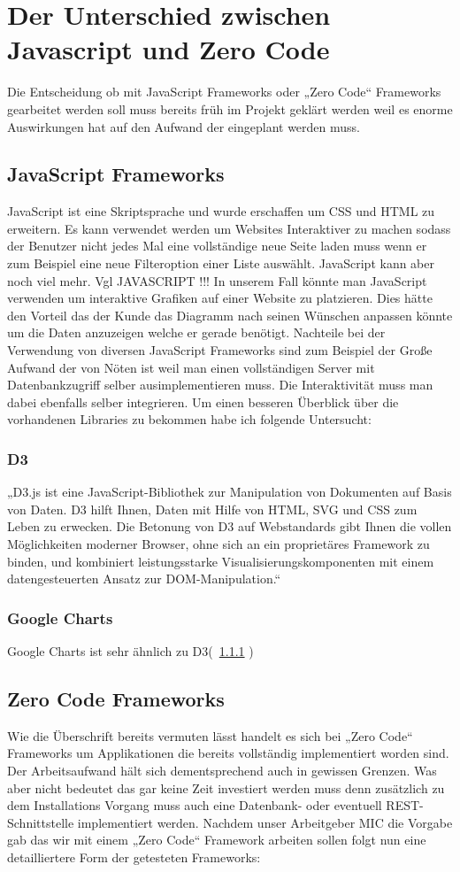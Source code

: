 \chapter{Der Unterschied zwischen Javascript und Zero Code}
Die Entscheidung ob mit JavaScript Frameworks oder „Zero Code“ Frameworks gearbeitet werden soll muss bereits früh im Projekt geklärt werden weil es enorme Auswirkungen hat auf den Aufwand der eingeplant werden muss.
\section{JavaScript Frameworks}
JavaScript ist eine Skriptsprache und wurde erschaffen um CSS und HTML zu erweitern. Es kann verwendet werden um Websites Interaktiver zu machen sodass der Benutzer nicht jedes Mal eine vollständige neue Seite laden muss wenn er zum Beispiel eine neue Filteroption einer Liste auswählt. JavaScript kann aber noch viel mehr. Vgl JAVASCRIPT !!!
In unserem Fall könnte man JavaScript verwenden um interaktive Grafiken auf einer Website zu platzieren. Dies hätte den Vorteil das der Kunde das Diagramm nach seinen Wünschen anpassen könnte um die Daten anzuzeigen welche er gerade benötigt. 
Nachteile bei der Verwendung von diversen JavaScript Frameworks sind zum Beispiel der Große Aufwand der von Nöten ist weil man einen vollständigen Server mit Datenbankzugriff selber ausimplementieren muss. Die Interaktivität muss man dabei ebenfalls selber integrieren.
Um einen besseren Überblick über die vorhandenen Libraries zu bekommen habe ich folgende Untersucht:
\subsection{D3}\label{ssec:D3}
„D3.js ist eine JavaScript-Bibliothek zur Manipulation von Dokumenten auf Basis von Daten. D3 hilft Ihnen, Daten mit Hilfe von HTML, SVG und CSS zum Leben zu erwecken. Die Betonung von D3 auf Webstandards gibt Ihnen die vollen Möglichkeiten moderner Browser, ohne sich an ein proprietäres Framework zu binden, und kombiniert leistungsstarke Visualisierungskomponenten mit einem datengesteuerten Ansatz zur DOM-Manipulation.“~\cite{d3js} 
\subsection{Google Charts}
Google Charts ist sehr ähnlich zu D3(~\ref{ssec:D3} ) 
\section{Zero Code Frameworks}
Wie die Überschrift bereits vermuten lässt handelt es sich bei „Zero Code“ Frameworks um Applikationen die bereits vollständig implementiert worden sind. Der Arbeitsaufwand hält sich dementsprechend auch in gewissen Grenzen. Was aber nicht bedeutet das gar keine Zeit investiert werden muss denn zusätzlich zu dem Installations Vorgang muss auch eine Datenbank- oder eventuell REST-Schnittstelle implementiert werden. Nachdem unser Arbeitgeber MIC die Vorgabe gab das wir mit einem „Zero Code“ Framework arbeiten sollen folgt nun eine detailliertere Form der getesteten Frameworks:

